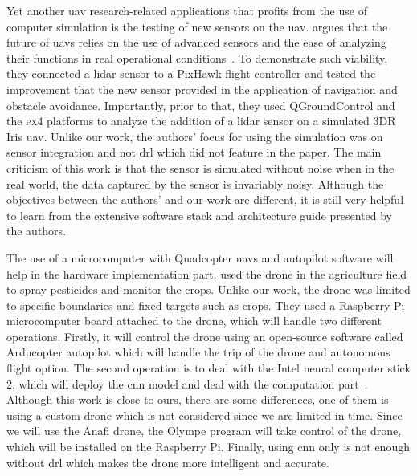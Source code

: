 \documentclass[../main.tex]{subfiles}
\begin{document}
Yet another \gls{uav} research-related applications 
that profits from the use of computer simulation 
is the testing of new sensors on the \gls{uav}.
\citeauthor{Gar20} argues that the future of \glspl{uav}
relies on the use of advanced sensors and 
the ease of analyzing their functions
in real operational conditions~\cite{Gar20}.
To demonstrate such viability, they connected a \gls{lidar} sensor
to a PixHawk flight controller and tested the improvement
that the new sensor provided
in the application of navigation and obstacle avoidance.
Importantly, prior to that, they used QGroundControl and the \textsc{px4}
platforms to analyze the addition of a \gls{lidar} sensor
on a simulated 3DR Iris \gls{uav}.
Unlike our work, the authors' focus for using the simulation
was on sensor integration and not \gls{drl} 
which did not feature in the paper. 
The main criticism of this work is that 
the sensor is simulated without noise
when in the real world, the data captured
by the sensor is invariably noisy.
Although the objectives between the authors' and our work
are different, it is still very helpful to learn from
the extensive software stack and architecture guide 
presented by the authors.



	The use of a microcomputer with Quadcopter \glspl{uav} and autopilot software will help in the hardware implementation part.
	\citeauthor{Khan21} used the drone in the agriculture field to spray 
	pesticides and monitor the crops. Unlike our work, the drone was limited to specific
	boundaries and fixed targets such as crops.
	They used a Raspberry Pi microcomputer board attached to the drone, which will handle two different operations. Firstly, it will control the drone using an open-source
	 software called Arducopter autopilot which will handle the trip of the drone and autonomous 
	 flight option. The second operation is to deal with the Intel neural computer stick 2, which will deploy the \gls{cnn} model and deal with the computation part~\cite{Khan21}.
	Although this work is close to ours, there are some differences, 
	one of them is using a custom drone which is not considered since we are limited in time.
	Since we will use the Anafi drone, the Olympe program will take control of the drone, which will
	 be installed on the Raspberry Pi. Finally, using \gls{cnn} only is not enough without \gls{drl} 
	 which makes the drone more intelligent and accurate.
\end{document}
